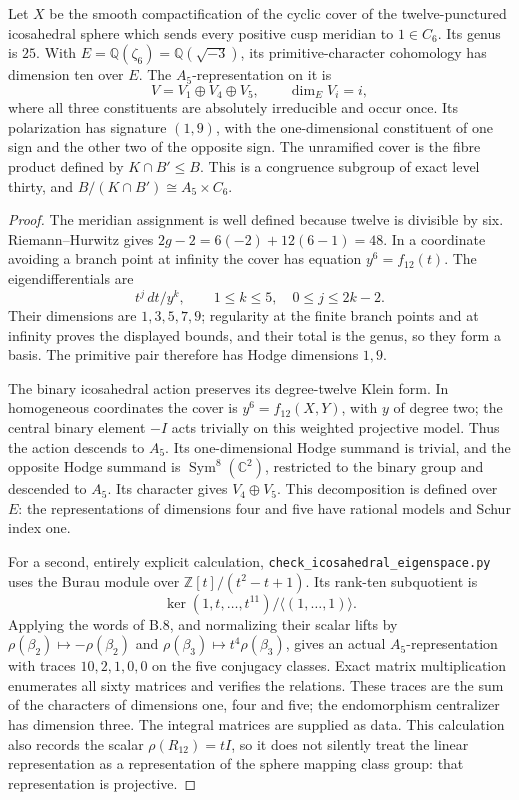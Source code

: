 Let \(X\) be the smooth compactification of the cyclic cover of
the twelve-punctured icosahedral sphere which sends every positive
cusp meridian to \(1\in C_6\). Its genus is \(25\).
With \(E=\mathbb Q(\zeta_6)=\mathbb Q(\sqrt{-3})\), its
primitive-character cohomology has dimension ten over \(E\).
The \(A_5\)-representation on it is
\[
 V=V_1\oplus V_4\oplus V_5,
 \qquad\dim_E V_i=i,
\]
where all three constituents are absolutely irreducible and
occur once. Its polarization has signature \((1,9)\), with
the one-dimensional constituent of one sign and the other two
of the opposite sign. The unramified cover is the fibre product
defined by \(K\cap B'\leq B\). This is a congruence
subgroup of exact level thirty, and
\(B/(K\cap B')\cong A_5\times C_6\).
\begin{proof}
The meridian assignment is well defined because twelve is
divisible by six. Riemann--Hurwitz gives
\(2g-2=6(-2)+12(6-1)=48\).
In a coordinate avoiding a branch point at infinity the cover
has equation \(y^6=f_{12}(t)\). The eigendifferentials are
\[
 t^j\,dt/y^k,\qquad 1\leq k\leq5,
                 \quad 0\leq j\leq2k-2.
\]
Their dimensions are \(1,3,5,7,9\); regularity at the finite
branch points and at infinity proves the displayed bounds, and
their total is the genus, so they form a basis. The primitive
pair therefore has Hodge dimensions \(1,9\).

The binary icosahedral action preserves its degree-twelve Klein
form. In homogeneous coordinates the cover is \(y^6=f_{12}(X,Y)\),
with \(y\) of degree two; the central binary element \(-I\)
acts trivially on this weighted projective model. Thus the
action descends to \(A_5\). Its one-dimensional Hodge summand
is trivial, and the opposite Hodge summand is
\(\operatorname{Sym}^8(\mathbb C^2)\), restricted to the binary
group and descended to \(A_5\). Its character gives
\(V_4\oplus V_5\). This decomposition is defined over \(E\):
the representations of dimensions four and five have rational
models and Schur index one.

For a second, entirely explicit calculation,
\texttt{check\_icosahedral\_eigenspace.py} uses the Burau module
over \(\mathbb Z[t]/(t^2-t+1)\). Its rank-ten subquotient is
\[
 \ker(1,t,\ldots,t^{11})/\langle(1,\ldots,1)\rangle.
\]
Applying the words of B.8, and normalizing their scalar lifts
by \(\rho(\beta_2)\mapsto-\rho(\beta_2)\) and
\(\rho(\beta_3)\mapsto t^4\rho(\beta_3)\), gives an actual
\(A_5\)-representation with traces \(10,2,1,0,0\) on the
five conjugacy classes. Exact matrix multiplication enumerates
all sixty matrices and verifies the relations. These traces
are the sum of the characters of dimensions one, four and five;
the endomorphism centralizer has dimension three. The integral
matrices are supplied as data. This calculation also records
the scalar \(\rho(R_{12})=tI\), so it does not silently treat
the linear representation as a representation of the sphere
mapping class group: that representation is projective.


\end{proof}
